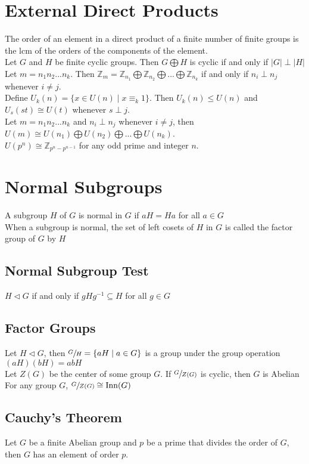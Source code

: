 \documentclass{article}
\begin{document}
\section{External Direct Products}
The order of an element in a direct product of a finite number of finite groups is the lcm of the orders of the components of the element. \\
Let $G$ and $H$ be finite cyclic groups. Then $G \bigoplus H$ is cyclic if and only if $|G| \perp |H|$ \\
Let $m = n_1n_2 ... n_k$. Then $\mathbb{Z}_m = \mathbb{Z}_{n_1} \bigoplus \mathbb{Z}_{n_2} \bigoplus ... \bigoplus \mathbb{Z}_{n_k}$ if and only if $n_i \perp n_j$ whenever $i \neq j$. \\
Define $U_k(n) = \{x \in U(n) \mid x \equiv_k 1\}$. Then $U_k(n) \leq U(n)$ and $U_s(st) \cong U(t)$ whenever $s \perp j$.\\
Let $m = n_1n_2 ... n_k$ and $n_i \perp n_j$ whenever $i \neq j$, then $U(m) \cong U(n_1) \bigoplus U(n_2) \bigoplus ... \bigoplus U(n_k)$. \\
$U(p^n) \cong \mathbb{Z}_{p^n - p^{n-1}}$ for any odd prime and integer $n$.


\section{Normal Subgroups}
A subgroup $H$ of $G$ is normal in $G$ if $aH = Ha$ for all $a \in G$ \\
When a subgroup is normal, the set of left cosets of $H$ in $G$ is called the factor group of $G$ by $H$ 
\subsection{Normal Subgroup Test}
$H \triangleleft G$ if and only if $gHg^{-1} \subseteq H$ for all $g \in G$
\subsection{Factor Groups}
Let $H \triangleleft G$, then $\sfrac{G}{H} = \{aH \mid a \in G \}$ is a group under the group operation $(aH)(bH) = abH$ \\
Let $Z(G)$ be the center of some group $G$. If $\sfrac{G}{Z(G)}$ is cyclic, then $G$ is Abelian \\
For any group $G$, $\sfrac{G}{Z(G)} \cong \text{Inn}(G)$
\subsection{Cauchy's Theorem}
Let $G$ be a finite Abelian group and $p$ be a prime that divides the order of $G$, then $G$ has an element of order $p$.
\end{document}
